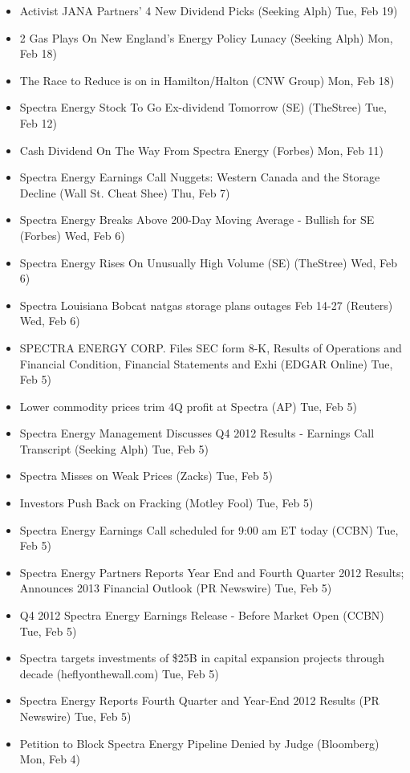 \documentclass[11pt,asymmetric]{article}
\begin{document}
\begin{itemize}
\item Activist JANA Partners' 4 New Dividend Picks (Seeking Alph) Tue, Feb 19)
\item 2 Gas Plays On New England's Energy Policy Lunacy (Seeking Alph) Mon, Feb 18)
\item The Race to Reduce is on in Hamilton/Halton (CNW Group) Mon, Feb 18)
\item Spectra Energy Stock To Go Ex-dividend Tomorrow (SE) (TheStree) Tue, Feb 12)
\item Cash Dividend On The Way From Spectra Energy (Forbes) Mon, Feb 11)
\item Spectra Energy Earnings Call Nuggets: Western Canada and the Storage Decline (Wall St. Cheat Shee) Thu, Feb 7)
\item Spectra Energy Breaks Above 200-Day Moving Average - Bullish for SE (Forbes) Wed, Feb 6)
\item Spectra Energy Rises On Unusually High Volume (SE) (TheStree) Wed, Feb 6)
\item Spectra Louisiana Bobcat natgas storage plans outages Feb 14-27 (Reuters) Wed, Feb 6)
\item SPECTRA ENERGY CORP. Files SEC form 8-K, Results of Operations and Financial Condition, Financial Statements and Exhi (EDGAR Online) Tue, Feb 5)
\item Lower commodity prices trim 4Q profit at Spectra (AP) Tue, Feb 5)
\item Spectra Energy Management Discusses Q4 2012 Results - Earnings Call Transcript (Seeking Alph) Tue, Feb 5)
\item Spectra Misses on Weak Prices (Zacks) Tue, Feb 5)
\item Investors Push Back on Fracking (Motley Fool) Tue, Feb 5)
\item Spectra Energy Earnings Call scheduled for 9:00 am ET today (CCBN) Tue, Feb 5)
\item Spectra Energy Partners Reports Year End and Fourth Quarter 2012 Results; Announces 2013 Financial Outlook (PR Newswire) Tue, Feb 5)
\item Q4 2012 Spectra Energy Earnings Release - Before Market Open (CCBN) Tue, Feb 5)
\item Spectra targets investments of \$25B in capital expansion projects through decade (heflyonthewall.com) Tue, Feb 5)
\item Spectra Energy Reports Fourth Quarter and Year-End 2012 Results (PR Newswire) Tue, Feb 5)
\item Petition to Block Spectra Energy Pipeline Denied by Judge (Bloomberg) Mon, Feb 4)

\end{itemize}
\end{document}
